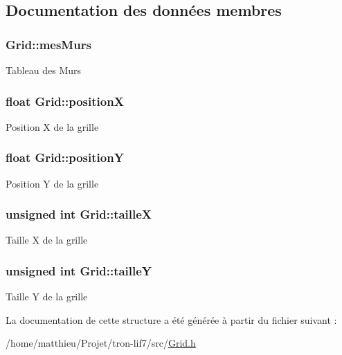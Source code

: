 \subsection{Documentation des données membres}
\hypertarget{structGrid_a0462856a88311819d0422a08b9bb0033}{
\subsubsection[{mes\-Murs}]{ Grid\-::mes\-Murs}}\label{structGrid_a0462856a88311819d0422a08b9bb0033}
Tableau des Murs \hypertarget{structGrid_a1712b348175d1449f924218abc2c180b}{
\subsubsection[{position\-X}]{\setlength{\rightskip}{0pt plus 5cm}float Grid\-::position\-X}}\label{structGrid_a1712b348175d1449f924218abc2c180b}
Position X de la grille \hypertarget{structGrid_aa084d4ec2894df907e02718c88ab4060}{
\subsubsection[{position\-Y}]{\setlength{\rightskip}{0pt plus 5cm}float Grid\-::position\-Y}}\label{structGrid_aa084d4ec2894df907e02718c88ab4060}
Position Y de la grille \hypertarget{structGrid_ad6ec58066a6303fbc2aa5443840cf067}{
\subsubsection[{taille\-X}]{\setlength{\rightskip}{0pt plus 5cm}unsigned int Grid\-::taille\-X}}\label{structGrid_ad6ec58066a6303fbc2aa5443840cf067}
Taille X de la grille \hypertarget{structGrid_adc12ffc8da211af2444db8a2007e5a7d}{
\subsubsection[{taille\-Y}]{\setlength{\rightskip}{0pt plus 5cm}unsigned int Grid\-::taille\-Y}}\label{structGrid_adc12ffc8da211af2444db8a2007e5a7d}
Taille Y de la grille 

La documentation de cette structure a été générée à partir du fichier suivant \-:\begin{DoxyCompactItemize}
\item 
/home/matthieu/\-Projet/tron-\/lif7/src/\hyperlink{Grid_8h}{Grid.\-h}\end{DoxyCompactItemize}
